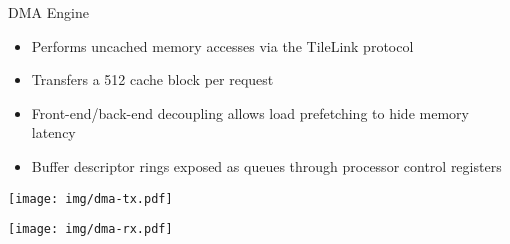 \begin{block}{DMA Engine}
\begin{itemize}
\footnotesize
\item Performs uncached memory accesses via the TileLink protocol
\item Transfers a \SI{512}{\bit} cache block per request
\item Front-end/back-end decoupling allows load prefetching to hide
	memory latency
\item Buffer descriptor rings exposed as queues through processor
	control registers
\end{itemize}

\begin{multicols}{2}
\centering
\texttt{[image: img/dma-tx.pdf]}

\columnbreak

\centering
\texttt{[image: img/dma-rx.pdf]}
\end{multicols}
\end{block}
